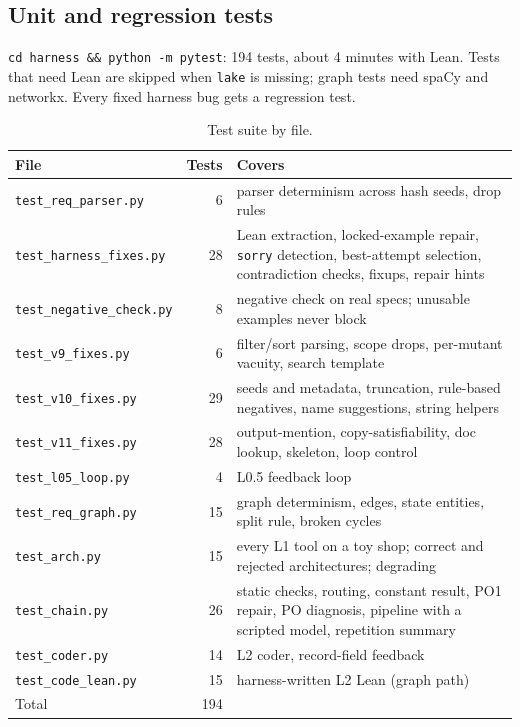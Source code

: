 \documentclass[11pt,a4paper]{article}
\newcommand{\code}[1]{\texttt{#1}}
\newcommand{\file}[1]{\texttt{#1}}
\begin{document}
\subsection{Unit and regression tests}
\code{cd harness \&\& python -m pytest}: 194 tests, about 4 minutes with Lean. Tests that need
Lean are skipped when \code{lake} is missing; graph tests need spaCy and networkx. Every fixed
harness bug gets a regression test.

\begin{table}[h]
\centering
\small
\begin{tabularx}{\linewidth}{l r L}
\toprule
File & Tests & Covers \\
\midrule
\file{test\_req\_parser.py} & 6 & parser determinism across hash seeds, drop rules \\
\file{test\_harness\_fixes.py} & 28 & Lean extraction, locked-example repair, \code{sorry} detection, best-attempt selection, contradiction checks, fixups, repair hints \\
\file{test\_negative\_check.py} & 8 & negative check on real specs; unusable examples never block \\
\file{test\_v9\_fixes.py} & 6 & filter/sort parsing, scope drops, per-mutant vacuity, search template \\
\file{test\_v10\_fixes.py} & 29 & seeds and metadata, truncation, rule-based negatives, name suggestions, string helpers \\
\file{test\_v11\_fixes.py} & 28 & output-mention, copy-satisfiability, doc lookup, skeleton, loop control \\
\file{test\_l05\_loop.py} & 4 & L0.5 feedback loop \\
\file{test\_req\_graph.py} & 15 & graph determinism, edges, state entities, split rule, broken cycles \\
\file{test\_arch.py} & 15 & every L1 tool on a toy shop; correct and rejected architectures; degrading \\
\file{test\_chain.py} & 26 & static checks, routing, constant result, PO1 repair, PO diagnosis, pipeline with a scripted model, repetition summary \\
\file{test\_coder.py} & 14 & L2 coder, record-field feedback \\
\file{test\_code\_lean.py} & 15 & harness-written L2 Lean (graph path) \\
\midrule
Total & 194 & \\
\bottomrule
\end{tabularx}
\caption{Test suite by file.}
\end{table}
\end{document}
